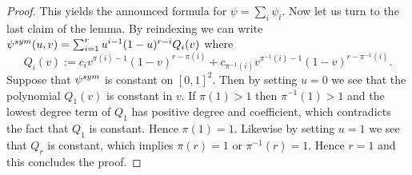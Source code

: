 \documentclass{article}
\theoremstyle{remark}
\def\carre{[0,1]^2}
\begin{document}
\begin{proof}
    This yields the announced formula for $\psi = \sum_i \psi_i$.
    Now let us turn to the last claim of the lemma.
    By reindexing we can write $\psi^{\rm sym}(u,v) = \sum_{i=1}^r u^{i-1} (1-u)^{r-i} Q_i(v)$ where 
    $$ Q_i(v) := c_i v^{\pi(i)-1} (1-v)^{r-\pi(i)} + c_{\pi^{-1}(i)} v^{\pi^{-1}(i)-1} (1-v)^{r-\pi^{-1}(i)} .$$
    Suppose that $\psi^{\rm sym}$ is constant on $\carre$.
    Then by setting $u=0$ we see that the polynomial $Q_1(v)$ is constant in $v$.
    If $\pi(1)>1$ then $\pi^{-1}(1)>1$ and the lowest degree term of $Q_1$ has positive degree and coefficient, which contradicts the fact that $Q_1$ is constant.
    Hence $\pi(1)=1$.
    Likewise by setting $u=1$ we see that $Q_{r}$ is constant, which implies $\pi(r)=1$ or $\pi^{-1}(r)=1$.
    Hence $r=1$ and this concludes the proof.
\end{proof}
\end{document}
